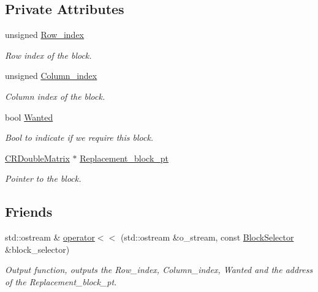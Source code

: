 \subsection*{Private Attributes}
\begin{DoxyCompactItemize}
\item 
unsigned \hyperlink{classoomph_1_1BlockSelector_ae48060783b1f4744b14a4477190e205e}{Row\+\_\+index}
\begin{DoxyCompactList}\small\item\em Row index of the block. \end{DoxyCompactList}\item 
unsigned \hyperlink{classoomph_1_1BlockSelector_adac07173a35f4f7f28e67b4b62306777}{Column\+\_\+index}
\begin{DoxyCompactList}\small\item\em Column index of the block. \end{DoxyCompactList}\item 
bool \hyperlink{classoomph_1_1BlockSelector_ad5b7ec23096f89f3d0cceed70ca07fdb}{Wanted}
\begin{DoxyCompactList}\small\item\em Bool to indicate if we require this block. \end{DoxyCompactList}\item 
\hyperlink{classoomph_1_1CRDoubleMatrix}{C\+R\+Double\+Matrix} $\ast$ \hyperlink{classoomph_1_1BlockSelector_ad18ae2223ddfb1a1b61937930357bfc8}{Replacement\+\_\+block\+\_\+pt}
\begin{DoxyCompactList}\small\item\em Pointer to the block. \end{DoxyCompactList}\end{DoxyCompactItemize}
\subsection*{Friends}
\begin{DoxyCompactItemize}
\item 
std\+::ostream \& \hyperlink{classoomph_1_1BlockSelector_aae471ca00fb73dad738500975f46071b}{operator$<$$<$} (std\+::ostream \&o\+\_\+stream, const \hyperlink{classoomph_1_1BlockSelector}{Block\+Selector} \&block\+\_\+selector)
\begin{DoxyCompactList}\small\item\em Output function, outputs the Row\+\_\+index, Column\+\_\+index, Wanted and the address of the Replacement\+\_\+block\+\_\+pt. \end{DoxyCompactList}\end{DoxyCompactItemize}


